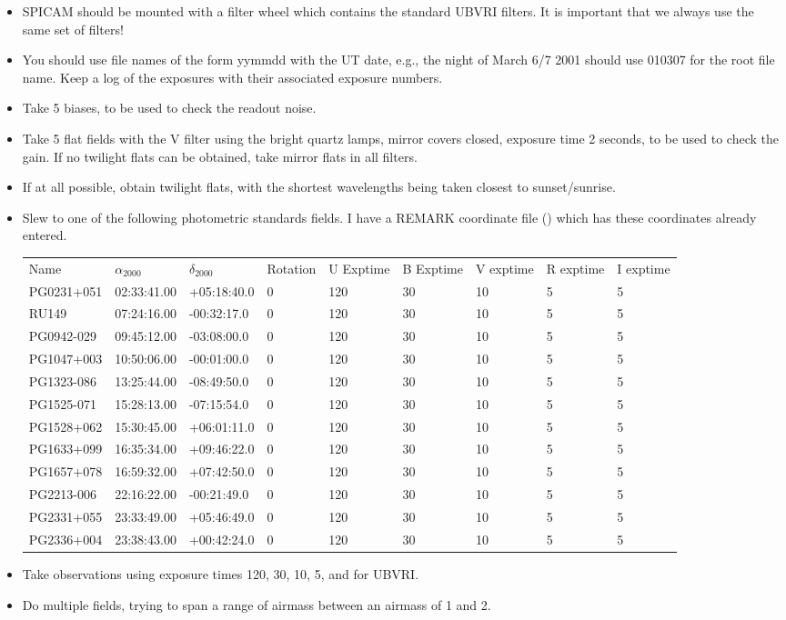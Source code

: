 \documentclass{article}
\begin{document}
\begin{itemize}

\item SPICAM should be mounted with a filter wheel which contains the standard
UBVRI filters. It is important that we always use the same set of filters!

\item You should use file names of the form yymmdd with the UT date,
e.g., the night of March 6/7 2001 should use 010307 for the root file name.
Keep a log of the exposures with their associated exposure numbers.

\item Take 5 biases, to be used to check the readout noise.

\item Take 5 flat fields with the V filter using the bright quartz lamps, 
mirror covers closed, exposure time 2 seconds, to be used to check the gain.
If no twilight flats can be obtained, take mirror flats in all filters.

\item If at all possible, obtain twilight flats, with the shortest
wavelengths being taken closest to sunset/sunrise.

\item Slew to one of the following photometric standards fields.
I have a  REMARK coordinate file () which has these coordinates already entered.

\begin{tabular}{lllllllll}
Name&$\alpha_{2000}$&$\delta_{2000}$&Rotation&U Exptime&B Exptime& V exptime & R exptime & I exptime\\
PG0231+051&02:33:41.00&+05:18:40.0&0&120&30&10&5&5\\
RU149     &07:24:16.00&-00:32:17.0&0&120&30&10&5&5\\
PG0942-029&09:45:12.00&-03:08:00.0&0&120&30&10&5&5\\
PG1047+003&10:50:06.00&-00:01:00.0&0&120&30&10&5&5\\
PG1323-086&13:25:44.00&-08:49:50.0&0&120&30&10&5&5\\
PG1525-071&15:28:13.00&-07:15:54.0&0&120&30&10&5&5\\
PG1528+062&15:30:45.00&+06:01:11.0&0&120&30&10&5&5\\
PG1633+099&16:35:34.00&+09:46:22.0&0&120&30&10&5&5\\
PG1657+078&16:59:32.00&+07:42:50.0&0&120&30&10&5&5\\
PG2213-006&22:16:22.00&-00:21:49.0&0&120&30&10&5&5\\
PG2331+055&23:33:49.00&+05:46:49.0&0&120&30&10&5&5\\
PG2336+004&23:38:43.00&+00:42:24.0&0&120&30&10&5&5
\end{tabular}

\item Take observations using exposure times 120, 30, 10, 5, and for UBVRI.

\item Do multiple fields, trying to span a range of airmass between
an airmass of 1 and 2.

\end{itemize}
\end{document}
